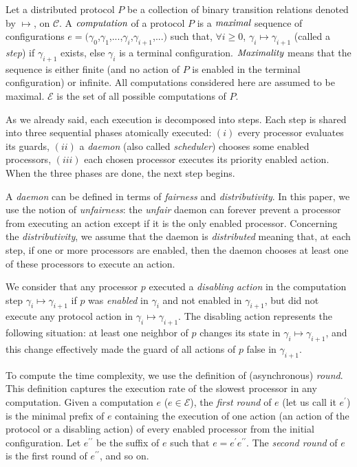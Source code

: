 \documentclass[11pt,letterpaper,onecolumn]{article}
\begin{document}
Let a distributed protocol $P$ be a collection of binary transition relations denoted by $\mapsto$, on $\mathcal C$. A $\emph{computation}$ of a protocol $P$ is a $\emph{maximal}$ sequence of configurations $e=(\gamma _{0}$,$\gamma_{1}$,...,$\gamma_{i}$,$\gamma _{i+1}$,...$)$ such that, $\forall i\geq 0$, $\gamma_{i}\mapsto \gamma _{i+1}$ (called a {\em step}) if $\gamma_{i+1}$ exists, else $\gamma_{i}$ is a terminal configuration. $\emph{Maximality}$ means that the sequence is either finite (and no action of $P$ is enabled in the terminal configuration) or infinite. All computations considered here are assumed to be maximal. $\mathcal E$ is the set of all possible computations of $P$.

As we already said, each execution is decomposed into steps. Each step is shared into three sequential phases atomically executed: $(i)$ every processor evaluates its guards, $(ii)$ a {\em daemon} (also called {\em scheduler}) chooses some enabled processors, $(iii)$ each chosen processor executes its priority enabled action. When the three phases are done, the next step begins. 

A {\em daemon} can be defined in terms of {\em fairness} and {\em distributivity}. In this paper, we use the notion of {\em unfairness}: the {\em unfair} daemon can forever prevent a processor from executing an action except if it is the only enabled processor. Concerning the {\em distributivity}, we assume that the daemon is {\em distributed} meaning that, at each step, if one or more processors are enabled, then the daemon chooses at least one of these processors to execute an action.

We consider that any processor $p$ executed a {\em disabling} {\em action} in the computation step $\gamma_{i}\mapsto \gamma _{i+1}$ if $p$ was {\em enabled} in $\gamma_{i}$ and not enabled in $\gamma_{i+1}$, but did not execute any protocol action in $\gamma_{i}\mapsto \gamma _{i+1}$. The disabling action represents the following situation: at least one neighbor of $p$ changes its state in $\gamma_i \mapsto \gamma_{i+1}$, and this change effectively made the guard of all actions of $p$ false in $\gamma_{i+1}$.

To compute the time complexity, we use the definition of (asynchronous) \emph{round}. This definition captures the execution rate of the slowest processor in any computation. Given a computation $e$ ($e \in \mathcal{E}$), the \emph{first round} of $e$ (let us call it $e^{\prime}$) is the minimal prefix of $e$ containing the execution of one action (an action of the protocol or a disabling action) of every enabled processor from the initial configuration.  Let $e^{\prime \prime}$ be the suffix of $e$ such that $e=e^{\prime}e^{\prime \prime}$. The \emph{second round} of $e$ is the first round of $e^{\prime \prime}$, and so on.
\end{document}
